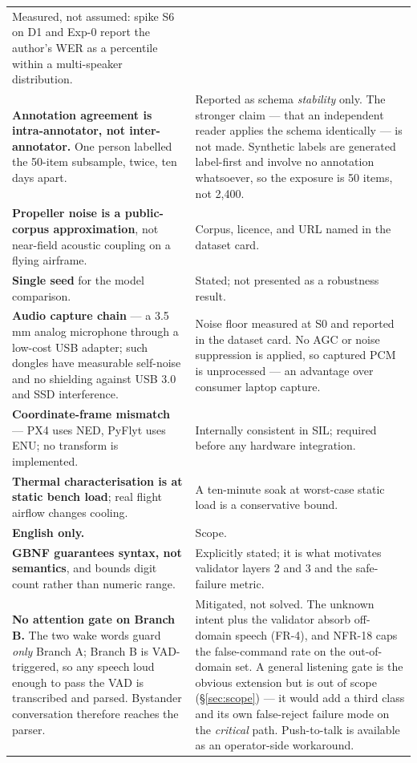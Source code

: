 \documentclass[11pt,a4paper]{article}
\newcommand{\code}[1]{{\ttfamily\small #1}}
\newcommand{\munit}[1]{\,#1}
\begin{document}
\begin{longtable}{@{}P{0.54}P{0.40}@{}}
  Measured, not assumed: spike S6 on D1 and Exp-0 report the author's WER as a percentile within a
  multi-speaker distribution. \\
\textbf{Annotation agreement is intra-annotator, not inter-annotator.} One person labelled the 50-item
subsample, twice, ten days apart. & Reported as schema \emph{stability} only. The stronger claim --- that an
independent reader applies the schema identically --- is not made. Synthetic labels are generated
label-first and involve no annotation whatsoever, so the exposure is 50 items, not 2{,}400. \\
\textbf{Propeller noise is a public-corpus approximation}, not near-field acoustic coupling on a flying
  airframe. & Corpus, licence, and URL named in the dataset card. \\
\textbf{Single seed} for the model comparison. & Stated; not presented as a robustness result. \\
\textbf{Audio capture chain} --- a 3.5\munit{mm} analog microphone through a low-cost USB adapter; such
  dongles have measurable self-noise and no shielding against USB 3.0 and SSD interference. & Noise floor
  measured at S0 and reported in the dataset card. No AGC or noise suppression is applied, so captured PCM
  is unprocessed --- an advantage over consumer laptop capture. \\
\textbf{Coordinate-frame mismatch} --- PX4 uses NED, PyFlyt uses ENU; no transform is implemented. &
  Internally consistent in SIL; required before any hardware integration. \\
\textbf{Thermal characterisation is at static bench load}; real flight airflow changes cooling. & A
  ten-minute soak at worst-case static load is a conservative bound. \\
\textbf{English only.} & Scope. \\
\textbf{GBNF guarantees syntax, not semantics}, and bounds digit count rather than numeric range. &
  Explicitly stated; it is what motivates validator layers 2 and 3 and the safe-failure metric. \\
\textbf{No attention gate on Branch B.} The two wake words guard \emph{only} Branch A; Branch B is
  VAD-triggered, so any speech loud enough to pass the VAD is transcribed and parsed. Bystander
  conversation therefore reaches the parser. & Mitigated, not solved. The \code{unknown} intent plus the
  validator absorb off-domain speech (FR-4), and NFR-18 caps the false-command rate on the out-of-domain
  set. A general listening gate is the obvious extension but is out of scope (\S\ref{sec:scope}) --- it
  would add a third class and its own false-reject failure mode on the \emph{critical} path.
  Push-to-talk is available as an operator-side workaround. \\
\end{longtable}
\end{document}
